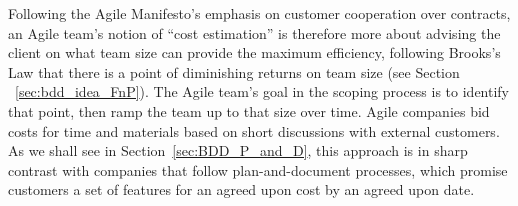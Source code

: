 \begin{summary}
Following the Agile Manifesto's emphasis on customer cooperation over contracts, an Agile team's notion of ``cost estimation'' is therefore more about advising the client on what team size can provide the maximum efficiency, following Brooks's Law that there is a point of diminishing returns on team size (see Section ~\ref{sec:bdd_idea_FnP}).  The Agile team's goal in the scoping process is to identify that point, then ramp the team up to that size over time. Agile companies bid costs for time and materials based on short discussions with external customers. As we shall see in Section~\ref{sec:BDD_P_and_D}, this approach is in sharp contrast with companies that follow plan-and-document processes, which promise customers a set of features for an agreed upon cost by an agreed upon date.
\end{summary}
